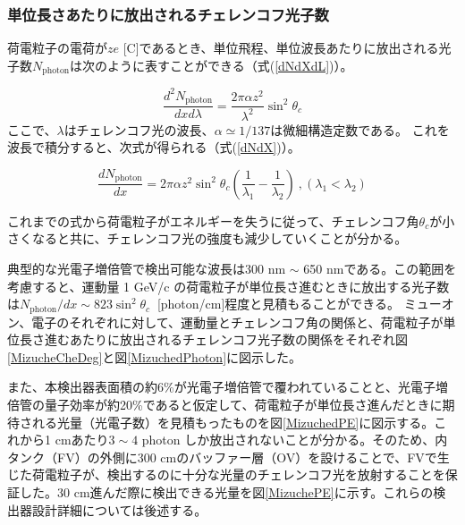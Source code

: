 \documentclass[11pt]{ltjsreport}
\newcommand{\figref}[1]{図\ref{#1}}
\newcommand{\equref}[1]{式(\ref{#1})}
\newcommand{\photon}{\mathrm{photon}}
\begin{document}
\subsubsection{単位長さあたりに放出されるチェレンコフ光子数}
荷電粒子の電荷が$ze$ [C]であるとき、単位飛程、単位波長あたりに放出される光子数$N_{\photon}$は次のように表すことができる（\equref{dNdXdL}）。

\begin{equation}
\frac{d^{2}N_{\photon}}{dxd\lambda} =  \frac{2 \pi \alpha z^{2}}{\lambda^{2}} \sin^{2} \theta_{c}
\label{dNdXdL}
\end{equation}
ここで、$\lambda$はチェレンコフ光の波長、$\alpha \simeq 1/137$は微細構造定数である。
これを波長で積分すると、次式が得られる（\equref{dNdX}）。

\begin{equation}
\frac{dN_{\photon}}{dx} =  2 \pi \alpha z^{2} \sin^{2} \theta_{c} \left( \frac{1}{\lambda_{1}}-\frac{1}{\lambda_{2}} \right) \ , (\lambda_{1} < \lambda_{2})
\label{dNdX}
\end{equation}

これまでの式から荷電粒子がエネルギーを失うに従って、チェレンコフ角$\theta_{c}$が小さくなると共に、チェレンコフ光の強度も減少していくことが分かる。

典型的な光電子増倍管で検出可能な波長は300 nm $\sim$ 650 nmである。この範囲を考慮すると、運動量 1 GeV/c の荷電粒子が単位長さ進むときに放出する光子数は$N_{\photon}/dx \sim 823\sin^{2}\theta_{c}\ $ [photon/cm]程度と見積もることができる。
ミューオン、電子のそれぞれに対して、運動量とチェレンコフ角の関係と、荷電粒子が単位長さ進むあたりに放出されるチェレンコフ光子数の関係をそれぞれ\figref{MizucheCheDeg}と\figref{MizuchedPhoton}に図示した。

また、本検出器表面積の約6\%が光電子増倍管で覆われていることと、光電子増倍管の量子効率が約20\%であると仮定して、荷電粒子が単位長さ進んだときに期待される光量（光電子数）を見積もったものを\figref{MizuchedPE}に図示する。これから1 cmあたり$3\sim4$ photon しか放出されないことが分かる。そのため、内タンク（FV）の外側に300 cmのバッファー層（OV）を設けることで、FVで生じた荷電粒子が、検出するのに十分な光量のチェレンコフ光を放射することを保証した。30 cm進んだ際に検出できる光量を\figref{MizuchePE}に示す。これらの検出器設計詳細については後述する。
\end{document}

